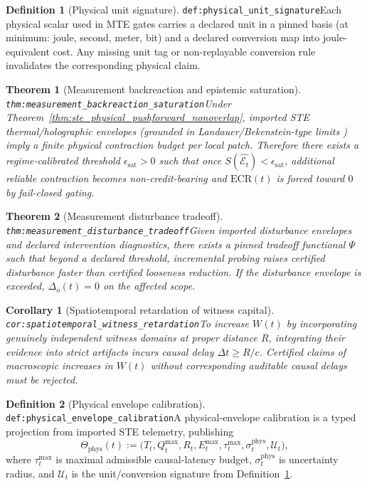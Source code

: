 \documentclass[11pt]{article}
\theoremstyle{definition}
\newtheorem{definition}{Definition}
\theoremstyle{plain}
\newtheorem{theorem}{Theorem}
\newtheorem{corollary}{Corollary}
\newcommand{\STE}{\textsf{STE}}
\newcommand{\MTE}{\textsf{MTE}}
\newcommand{\lbl}[1]{\texttt{\footnotesize\nolinkurl{#1}}}
\newcommand{\DefLabel}[1]{\hfill{\small\lbl{#1}}}
\newcommand{\deltao}{\Delta_o}
\newcommand{\Et}{\mathcal{E}_t}
\newcommand{\epssat}{\epsilon_{\mathrm{sat}}}
\newcommand{\clight}{c}
\begin{document}
\begin{definition}[Physical unit signature]\DefLabel{def:physical_unit_signature}\label{def:physical_unit_signature}
Each physical scalar used in \MTE{} gates carries a declared unit in a pinned basis (at minimum: joule, second, meter, bit) and a declared conversion map into joule-equivalent cost.
Any missing unit tag or non-replayable conversion rule invalidates the corresponding physical claim.
\end{definition}

\begin{theorem}[Measurement backreaction and epistemic saturation]\DefLabel{thm:measurement_backreaction_saturation}\label{thm:measurement_backreaction_saturation}
Under Theorem~\ref{thm:ste_physical_pushforward_nonoverlap}, imported \STE{} thermal/holographic envelopes (grounded in Landauer/Bekenstein-type limits \cite{Landauer1961,Bekenstein1973}) imply a finite physical contraction budget per local patch.
Therefore there exists a regime-calibrated threshold $\epssat>0$ such that once $S(\widehat{\Et})<\epssat$, additional reliable contraction becomes non-credit-bearing and $\mathrm{ECR}(t)$ is forced toward $0$ by fail-closed gating.
\end{theorem}

\begin{theorem}[Measurement disturbance tradeoff]\DefLabel{thm:measurement_disturbance_tradeoff}\label{thm:measurement_disturbance_tradeoff}
Given imported disturbance envelopes and declared intervention diagnostics, there exists a pinned tradeoff functional $\Psi$ such that beyond a declared threshold, incremental probing raises certified disturbance faster than certified looseness reduction.
If the disturbance envelope is exceeded, $\deltao(t)=0$ on the affected scope.
\end{theorem}

\begin{corollary}[Spatiotemporal retardation of witness capital]\DefLabel{cor:spatiotemporal_witness_retardation}\label{cor:spatiotemporal_witness_retardation}
To increase $W(t)$ by incorporating genuinely independent witness domains at proper distance $R$, integrating their evidence into strict artifacts incurs causal delay $\Delta t \ge R/\clight$.
Certified claims of macroscopic increases in $W(t)$ without corresponding auditable causal delays must be rejected.
\end{corollary}

\begin{definition}[Physical envelope calibration]\DefLabel{def:physical_envelope_calibration}\label{def:physical_envelope_calibration}
A physical-envelope calibration is a typed projection from imported \STE{} telemetry, publishing
\[
\Theta_{\mathrm{phys}}(t):=\big(T_t,Q^{\max}_t,R_t,E^{\max}_t,\tau^{\max}_t,\sigma^{\mathrm{phys}}_t,\mathcal{U}_t\big),
\]
where $\tau^{\max}_t$ is maximal admissible causal-latency budget, $\sigma^{\mathrm{phys}}_t$ is uncertainty radius, and $\mathcal{U}_t$ is the unit/conversion signature from Definition~\ref{def:physical_unit_signature}.
\end{definition}
\end{document}
